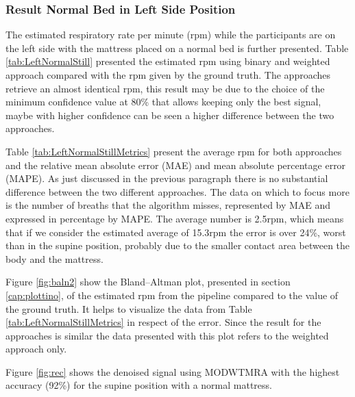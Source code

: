 
\subsubsection{Result Normal Bed in Left Side Position}   \label{cap:ResultNormalBed2}

The estimated respiratory rate per minute (rpm) while the participants are on the left side with the mattress placed on a normal bed is further presented. Table \ref{tab:LeftNormalStill} presented the estimated rpm using binary and weighted approach compared with the rpm given by the ground truth. The approaches retrieve an almost identical rpm, this result may be due to the choice of the minimum confidence value at 80\% that allows keeping only the best signal, maybe with higher confidence can be seen a higher difference between the two approaches. 

\vspace{1.3cm}
%


\vspace{0.5cm}

Table \ref{tab:LeftNormalStillMetrics} present the average rpm for both approaches  
and the relative mean absolute error (MAE) and mean absolute percentage error (MAPE). As just discussed in the previous paragraph there is no substantial difference between the two different approaches. The data on which to focus more is the number of breaths that the algorithm misses, represented by MAE and expressed in percentage by MAPE. The average number is 2.5rpm, which means that if we consider the estimated average of 15.3rpm the error is over 24\%, worst than in the supine position, probably due to the smaller contact area between the body and the mattress.

\vspace{1cm}

\vspace{0.5cm}

Figure \ref{fig:baln2} show the Bland–Altman plot, presented in section \ref{cap:plottino}, of the estimated rpm from the pipeline compared to the value of the ground truth. It helps to visualize the data from Table \ref{tab:LeftNormalStillMetrics} in respect of the error. Since the result for the approaches is similar the data presented with this plot refers to the weighted approach only.

Figure \ref{fig:rec} shows the denoised signal using MODWTMRA with the highest accuracy (92\%) for the supine position with a normal mattress.

